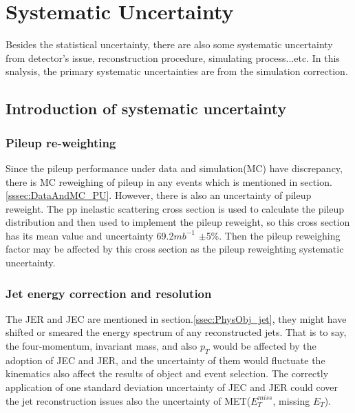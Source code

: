 

\section{ Systematic Uncertainty}
\label{sec:Systematic}

	Besides the statistical uncertainty, there are also some systematic uncertainty from detector's issue, reconstruction procedure, simulating process...etc. In this snalysis, the primary systematic uncertainties are from the simulation correction. 

	\subsection{Introduction of systematic uncertainty}
	\label{ssec:Syst_type}
		\subsubsection{Pileup re-weighting}
		\label{sssec:Syst_PU}


			Since the pileup performance under data and simulation(MC) have discrepancy, there is MC reweighing of pileup in any events which is mentioned in section.\ref{sssec:DataAndMC_PU}. However, there is also an uncertainty of pileup reweight. The pp inelastic scattering cross section is used to calculate the pileup distribution and then used to implement the pileup reweight, so this cross section has its mean value and uncertainty 69.2$mb^{-1}$ $\pm$5\%. Then the pileup reweighing factor may be affected by this cross section as the pileup reweighting systematic uncertainty.

		\subsubsection{Jet energy correction and resolution}
		\label{sssec:Syst_JECJER}

			The JER and JEC are mentioned in section.\ref{ssec:PhysObj_jet}, they might have shifted or smeared the energy spectrum of any reconstructed jets. That is to say, the four-momentum, invariant mass, and also $p_T$ would be affected by the adoption of JEC and JER, and the uncertainty of them would fluctuate the kinematics also affect the results of object and event selection. The correctly application of one standard deviation uncertainty of JEC and JER could cover the jet reconstruction issues also the uncertainty of MET($E_T^{miss}$, missing $E_T$).
			

